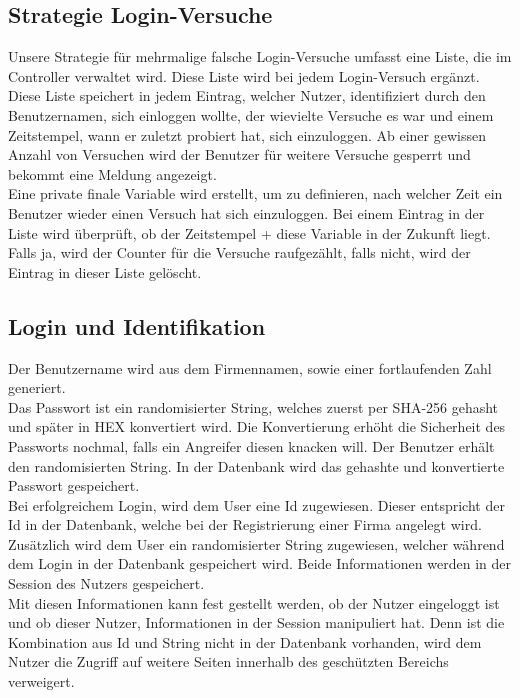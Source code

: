 \documentclass[12pt]{scrartcl}
\begin{document}
\subsection{Strategie Login-Versuche}
Unsere Strategie für mehrmalige falsche Login-Versuche umfasst eine Liste, die im Controller verwaltet wird. Diese Liste wird bei jedem Login-Versuch ergänzt. Diese Liste speichert in jedem Eintrag, welcher Nutzer, identifiziert durch den Benutzernamen, sich einloggen wollte, der wievielte Versuche es war und einem Zeitstempel, wann er zuletzt probiert hat, sich einzuloggen.
Ab einer gewissen Anzahl von Versuchen wird der Benutzer für weitere Versuche gesperrt und bekommt eine Meldung angezeigt.\\
Eine private finale Variable wird erstellt, um zu definieren, nach welcher Zeit ein Benutzer wieder einen Versuch hat sich einzuloggen. Bei einem Eintrag in der Liste wird überprüft, ob der Zeitstempel + diese Variable in der Zukunft liegt. Falls ja, wird der Counter für die Versuche raufgezählt, falls nicht, wird der Eintrag in dieser Liste gelöscht.\\

\subsection{Login und Identifikation}
Der Benutzername wird aus dem Firmennamen, sowie einer fortlaufenden Zahl generiert.\\
Das Passwort ist ein randomisierter String, welches zuerst per SHA-256 gehasht und später in HEX konvertiert wird. Die Konvertierung erhöht die Sicherheit des Passworts nochmal, falls ein Angreifer diesen knacken will. Der Benutzer erhält den randomisierten String. In der Datenbank wird das gehashte und konvertierte Passwort gespeichert.\\
Bei erfolgreichem Login, wird dem User eine Id zugewiesen. Dieser entspricht der Id in der Datenbank, welche bei der Registrierung einer Firma angelegt wird. Zusätzlich wird dem User ein randomisierter String zugewiesen, welcher während dem Login in der Datenbank gespeichert wird. Beide Informationen werden in der Session des Nutzers gespeichert.\\
Mit diesen Informationen kann fest gestellt werden, ob der Nutzer eingeloggt ist und ob dieser Nutzer, Informationen in der Session manipuliert hat. Denn ist die Kombination aus Id und String nicht in der Datenbank vorhanden, wird dem Nutzer die Zugriff auf weitere Seiten innerhalb des geschützten Bereichs verweigert.
\end{document}
